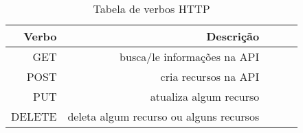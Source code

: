 \begin{table}[!htb]
    \centering
    \caption[verbos-http]{Tabela de verbos HTTP
    \label{tab:verbos-http}}
    \begin{tabular}{rrrrr}
        \toprule
            Verbo & Descrição \\ 
        \midrule
            GET & busca/le informações na API \\
            POST & cria recursos na API \\
            PUT &  atualiza algum recurso \\
            DELETE  & deleta algum recurso ou alguns recursos \\
        \bottomrule
    \end{tabular}
\end{table}